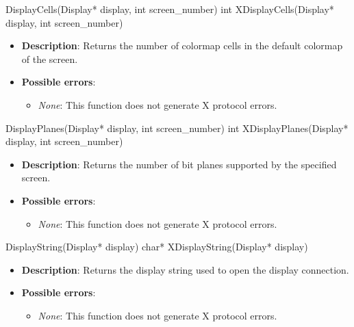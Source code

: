 \documentclass{report}
\begin{document}
\begin{itemize}
        \begin{cppcode}
            DisplayCells(Display* display, int screen_number)
            int XDisplayCells(Display* display, int screen_number)
        \end{cppcode}
        \begin{itemize}
            \item \textbf{Description}: Returns the number of colormap cells in the default colormap of the screen.
            \item \textbf{Possible errors}:
                \begin{itemize}
                    \item \textit{None}: This function does not generate X protocol errors.
                \end{itemize}
        \end{itemize}

        \begin{cppcode}
            DisplayPlanes(Display* display, int screen_number)
            int XDisplayPlanes(Display* display, int screen_number)
        \end{cppcode}
        \begin{itemize}
            \item \textbf{Description}: Returns the number of bit planes supported by the specified screen.
            \item \textbf{Possible errors}:
                \begin{itemize}
                    \item \textit{None}: This function does not generate X protocol errors.
                \end{itemize}
        \end{itemize}

        \begin{cppcode}
            DisplayString(Display* display)
            char* XDisplayString(Display* display)
        \end{cppcode}
        \begin{itemize}
            \item \textbf{Description}: Returns the display string used to open the display connection.
            \item \textbf{Possible errors}:
                \begin{itemize}
                    \item \textit{None}: This function does not generate X protocol errors.
                \end{itemize}
        \end{itemize}


\end{itemize}
\end{document}
